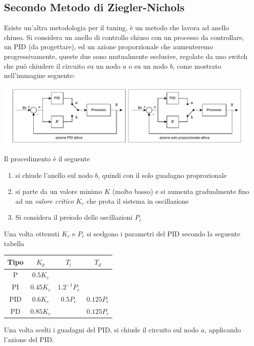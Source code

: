 \documentclass[10pt, letterpaper]{report}
\begin{document}
\subsection{Secondo Metodo di Ziegler-Nichols}
Esiste un'altra metodologia per il tuning, è un metodo che lavora ad anello chiuso. Si considera un anello di controllo chiuso con un processo da controllare, un PID (da progettare), ed un azione proporzionale che aumenteremo progressivamente, queste due sono mutualmente esclusive, regolate da uno switch che può chiudere il circuito su un nodo $a$ o su un nodo $b$, come mostrato nell'immagine seguente:
\begin{center}
    \includegraphics[width=1\textwidth]{images/2Metodo2N.pdf}
\end{center}
Il procedimento è il seguente \begin{enumerate}
    \item si chiude l'anello sul nodo $b$, quindi con il solo guadagno proprozionale 
    \item si parte da un valore minimo $K$ (molto basso) e si aumenta gradualmente fino ad un \textit{valore critico}  $K_c$ che prota il sistema in oscillazione
    \item Si considera il preiodo delle oscillazioni $P_c$
\end{enumerate}
Una volta ottenuti $K_c$ e $P_c$ si scelgono i parametri del PID secondo la seguente tabella 
\begin{center}
    \begin{tabular}{|c|c|c|c|}
        \hline
        Tipo & $K_p$     & $T_i$         & $T_d$      \\ \hline
        P    & $0.5K_c$  &               &            \\ \hline
        PI   & $0.45K_c$ & $1.2^{-1}P_c$ &            \\ \hline
        PID  & $0.6K_c$  & $0.5P_c$      & $0.125P_c$ \\ \hline
        PD   & $0.85K_c$ &               & $0.125P_c$ \\ \hline
    \end{tabular}
\end{center}
Una volta scelti i guadagni del PID, si chiude il circuito sul nodo $a$, applicando l'azione del PID.
\end{document}
